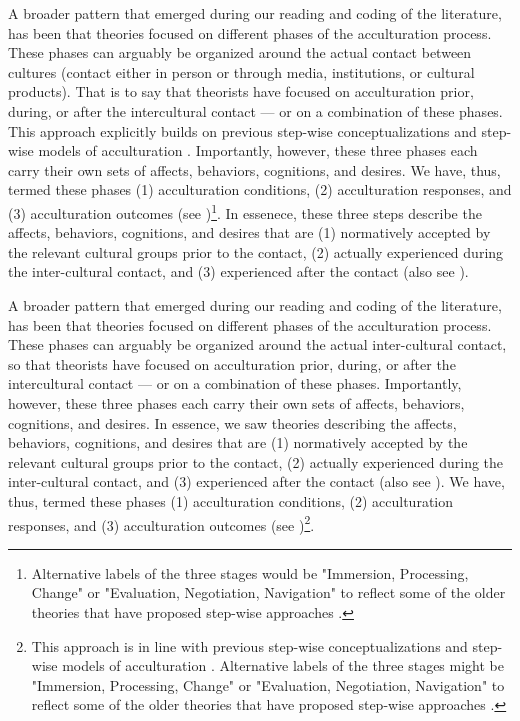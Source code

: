 A broader pattern that emerged during our reading and coding of the
literature, has been that theories focused on different phases of the
acculturation process. These phases can arguably be organized around the
actual contact between cultures (contact either in person or through
media, institutions, or cultural products). That is to say that
theorists have focused on acculturation prior, during, or after the
intercultural contact --- or on a combination of these phases. This
approach explicitly builds on previous step-wise conceptualizations
\citep[e.g., process vs. outcome distinction;][]{Sam2006b} and step-wise
models of acculturation
\citep[e.g.,][]{Arends-Toth2006a, TeLindert2008a}. Importantly, however,
these three phases each carry their own sets of affects, behaviors,
cognitions, and desires. We have, thus, termed these phases (1)
acculturation conditions, (2) acculturation responses, and (3)
acculturation outcomes (see
)\footnote{Alternative labels of the three stages would be "Immersion, Processing, Change" or "Evaluation, Negotiation, Navigation" to reflect some of the older theories that have proposed step-wise approaches \citep[e.g.,][]{Cross1991, Atkinson1993, Gordon1964a}.}.
In essenece, these three steps describe the affects, behaviors,
cognitions, and desires that are (1) normatively accepted by the
relevant cultural groups prior to the contact, (2) actually experienced
during the inter-cultural contact, and (3) experienced after the contact
(also see ).

A broader pattern that emerged during our reading and coding of the
literature, has been that theories focused on different phases of the
acculturation process. These phases can arguably be organized around the
actual inter-cultural contact, so that theorists have focused on
acculturation prior, during, or after the intercultural contact --- or
on a combination of these phases. Importantly, however, these three
phases each carry their own sets of affects, behaviors, cognitions, and
desires. In essence, we saw theories describing the affects, behaviors,
cognitions, and desires that are (1) normatively accepted by the
relevant cultural groups prior to the contact, (2) actually experienced
during the inter-cultural contact, and (3) experienced after the contact
(also see ). We have, thus, termed these phases
(1) acculturation conditions, (2) acculturation responses, and (3)
acculturation outcomes (see
)\footnote{This approach is in line with previous step-wise conceptualizations \citep[e.g., process vs. outcome distinction;][]{Sam2006b} and step-wise models of acculturation \citep[e.g.,][]{Arends-Toth2006a, TeLindert2008a}. Alternative labels of the three stages might be "Immersion, Processing, Change" or "Evaluation, Negotiation, Navigation" to reflect some of the older theories that have proposed step-wise approaches \citep[e.g.,][]{Cross1991, Atkinson1993, Gordon1964a}.}.

